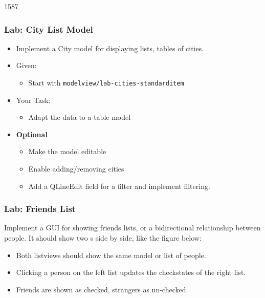 \begin{slide}{1587}
\frametitle{Lab: City List Model}
  \begin{itemize}
  \item Implement a City model for displaying lists, tables of cities. 
  \item Given:
    \begin{itemize}
    \item Start with \texttt{modelview/lab-cities-standarditem}
    \end{itemize}
  \item Your Task:
    \begin{itemize}
    \item Adapt the data to a table model
    \end{itemize}
  \item \textbf{Optional}
    \begin{itemize}
    \item Make the model editable
    \item Enable adding/removing cities
    \item Add a QLineEdit field for a filter and implement filtering.
   \end{itemize}
 \end{itemize}
\end{slide}

\begin{slide}[fragile]
\frametitle{Lab: Friends List}
Implement a GUI for showing friends lists, or a bidirectional relationship between people.
It should show two s side by side, like the figure below:


\begin{itemize}
\item  Both listviews should show the same model or list of people.
\item  Clicking a person on the left list updates the checkstates of the right list.
\item  Friends are shown as checked, strangers as un-checked. 
\end{itemize}
\end{slide}

